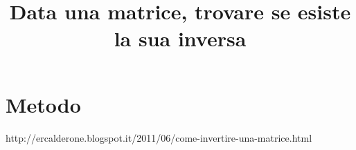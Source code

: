 \documentclass[a4paper,10pt]{article}
\title{Data una matrice, trovare se esiste la sua inversa}
\author{}
\begin{document}
\maketitle

\begin{abstract}

\end{abstract}

\section{Metodo}
http://ercalderone.blogspot.it/2011/06/come-invertire-una-matrice.html
\end{document}
